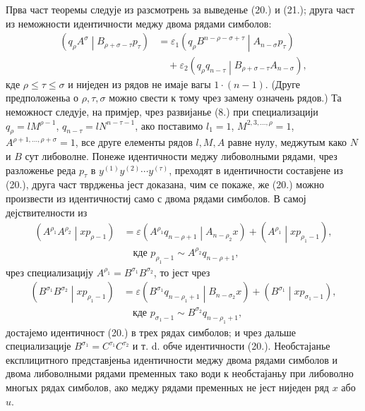 \documentclass[11pt]{article}
\newcommand{\pair}[2]{\left(#1\middle|#2\right)}
\newcommand{\eps}{\varepsilon}
\begin{document}
Прва част теоремы следује из разсмотрень за выведенье (20.) и (21.); друга част из неможности идентичности меджу двома рядами симболов:
\[
\begin{aligned}
\pair{q_\rho A^\sigma}{B_{\rho+\sigma-\tau}p_\tau}
&=\eps_1\pair{q_\rho B^{n-\rho-\sigma+\tau}}{A_{n-\sigma}p_\tau}\\
&\quad+\eps_2\pair{q_\rho q_{n-\tau}}{B_{\rho+\sigma-\tau}A_{n-\sigma}},
\end{aligned}
\]
кде $\rho\le\tau\le\sigma$ и ниједен из рядов не имаје вагы $1\cdot(n-1)$. (Друге предположеньа о $\rho,\tau,\sigma$ можно свести к тому чрез замену означень рядов.) Та неможност следује, на примјер, чрез развијанье (8.) при специализацији $q_\rho=lM^{\rho-1}$, $q_{n-\tau}=lN^{n-\tau-1}$, ако поставимо $l_1=1$, $M^{2,3,\ldots,\rho}=1$, $A^{\rho+1,\ldots,\rho+\sigma}=1$, все друге елементы рядов $l,M,A$ равне нулу, меджутым како $N$ и $B$ сут либоволне. Понеже идентичности меджу либоволными рядами, чрез разложенье реда $p_\tau$ в $y^{(1)}y^{(2)}\cdots y^{(\tau)}$, преходят в идентичности составјене из (20.), друга част тврдженьа јест доказана, чим се покаже, же (20.) можно произвести из идентичностиј само с двома рядами симболов. В самој дејствителности из
\begin{equation}
\begin{aligned}
\pair{A^{\rho_1}A^{\rho_2}}{xp_{\rho-1}}
&=\eps\pair{A^{\rho_1}q_{n-\rho+1}}{A_{n-\rho_2}x}
+\pair{A^{\rho_1}}{xp_{\rho_1-1}},\\
&\quad \text{кде }p_{\rho_1-1}\sim A^{\rho_2}q_{n-\rho+1},
\end{aligned}
\tag{20a}
\end{equation}
чрез специализацију $A^{\rho_1}=B^{\sigma_1}B^{\sigma_2}$, то јест чрез
\[
\begin{aligned}
\pair{B^{\sigma_1}B^{\sigma_2}}{xp_{\rho_1-1}}
&=\eps\pair{B^{\sigma_1}q_{n-\rho_1+1}}{B_{n-\sigma_2}x}
+\pair{B^{\sigma_1}}{xp_{\sigma_1-1}},\\
&\quad \text{кде } p_{\sigma_1-1}\sim B^{\sigma_2}q_{n-\rho_1+1},
\end{aligned}
\]
достајемо идентичност (20.) в трех рядах симболов; и чрез дальше специализације $B^{\sigma_1}=C^{\tau_1}C^{\tau_2}$ и т. d. обче идентичности (20.). Необстајанье експлицитного представјеньа идентичности меджу двома рядами симболов и двома либоволными рядами пременных тако води к необстајаньу при либоволно многых рядах симболов, ако меджу рядами пременных не јест ниједен ряд $x$ або $u$.
\end{document}
